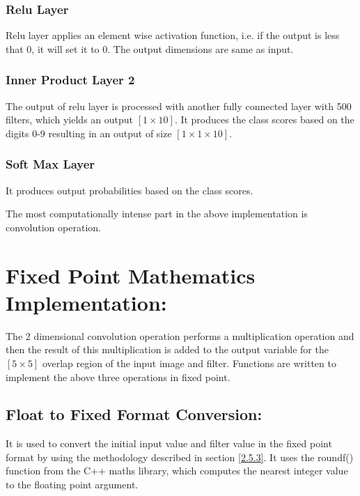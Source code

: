 \subsubsection{Relu Layer}\label{Relu Layer}
Relu layer applies an element wise activation function, i.e. if the output is less that 0, it will set it to 0. The output dimensions are same as input.
\subsubsection{Inner Product Layer 2}\label{Inner Product Layer 2}
The output of relu layer is processed with another fully connected layer with 500 filters, which yields an output $[1\times 10]$.
It produces the class scores based on the digits 0-9 resulting in an output of size $[1\times 1\times 10]$.
\subsubsection{Soft Max Layer}\label{Soft Max Layer}
It produces output probabilities based on the class scores.

\vspace{0.25cm}
\noindent The most computationally intense part in the above implementation is convolution operation.

\section{Fixed Point Mathematics Implementation:}
The 2 dimensional convolution operation performs a multiplication operation and then the result of this multiplication is added to the output variable for the $[5\times 5]$ overlap region of the input image and filter.
Functions are written to implement the above three operations in fixed point.

\vspace{0.25cm}
\subsection{Float to Fixed Format Conversion:}

\vspace{0.25cm}
\noindent It is used to convert the initial input value and filter value in the fixed point format by using the methodology described in section \ref{2.5.3}. It uses the roundf() function from the C++ maths library, which computes the nearest integer value to the floating point argument.


\vspace{0.25cm}
